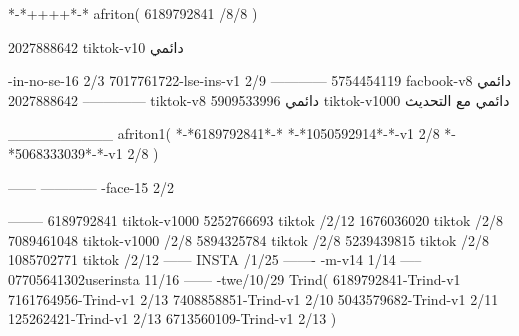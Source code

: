 *-*++++*-*
afriton(
6189792841 /8/8
)

2027888642 tiktok-v10
دائمي

-in-no-se-16 2/3
7017761722-lse-ins-v1 2/9
------------
5754454119 facbook-v8
دائمي
--------------
2027888642 tiktok-v8
دائمي
5909533996 tiktok-v1000
دائمي مع التحديث

__________
afriton1(
*-*6189792841*-*
*-*1050592914*-*-v1 2/8
*-*5068333039*-*-v1 2/8
)

------
------------
-face-15 2/2

--------
6189792841 tiktok-v1000
5252766693 tiktok /2/12
1676036020 tiktok /2/8
7089461048 tiktok-v1000 /2/8
5894325784 tiktok /2/8
5239439815 tiktok /2/8
1085702771 tiktok /2/12
------
 INSTA /1/25
-------
-m-v14 1/14
-----
07705641302userinsta 11/16
------
-twe/10/29
Trind(
6189792841-Trind-v1 
7161764956-Trind-v1 2/13
7408858851-Trind-v1 2/10
5043579682-Trind-v1 2/11
125262421-Trind-v1 2/13
6713560109-Trind-v1 2/13
)
